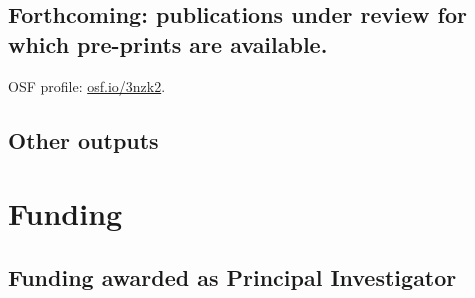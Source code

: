 \documentclass[10pt,a4paper,]{article}
\newcounter{papers}
\begin{document}
\nocite{langton2019cartograms,
solymosi2019exploring,
solymosi2018did,
solymosi2018role,
solymosi2017crowdsourcing,
solymosi2015mapping,
solymosi2015crowd}

\hypertarget{forthcoming-publications-under-review-for-which-pre-prints-are-available.}{%
\subsection{Forthcoming: publications under review for which pre-prints are available.}\label{forthcoming-publications-under-review-for-which-pre-prints-are-available.}}

OSF profile: \url{osf.io/3nzk2}.

\newrefcontext[sorting=none]\setcounter{papers}{0}\pagebreak[3]
\printbibliography[category=bib-forthcoming.bib-5116598,heading=none]\setcounter{papers}{0}

\nocite{buil2019non,
solymosi2019place,
solymosia2017alternative}

\hypertarget{other-outputs}{%
\subsection{Other outputs}\label{other-outputs}}

\newrefcontext[sorting=none]\setcounter{papers}{0}\pagebreak[3]
\printbibliography[category=bib-otherpubs.bib-5124139,heading=none]\setcounter{papers}{0}

\nocite{solymosi2019lse,
solymosi2019sagepub,
solymosi2019webinar,
solymosi2019ssi6,
solymosi2018ssi5,
solymosi2018ssi4,
solymosi2018ssi3,
solymosi2018ssi2,
solymosi2018ssi1,
solymosi2016confidence,
solymosia2014mapping,
solymosi2014tsc}

\hypertarget{funding}{%
\section{Funding}\label{funding}}

\hypertarget{funding-awarded-as-principal-investigator}{%
\subsection{Funding awarded as Principal Investigator}\label{funding-awarded-as-principal-investigator}}
\end{document}
